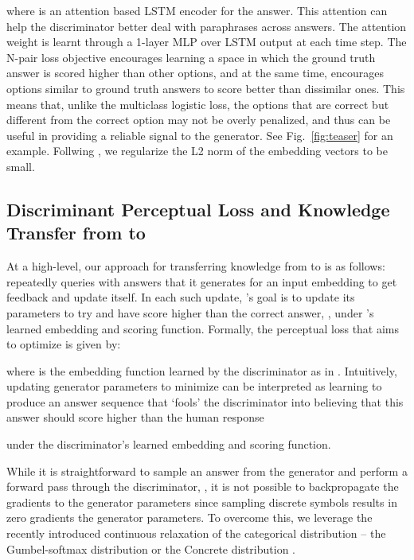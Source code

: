 \documentclass{article}
\begin{document}
where  is an attention based LSTM encoder for the answer. This attention can help the discriminator better deal with paraphrases across answers. The attention weight is learnt through a 1-layer MLP over LSTM output at each time step.
The N-pair loss objective encourages learning a space in which the ground truth answer is scored higher than other options, and at the same time, encourages options similar to ground truth answers to score better than dissimilar ones.  
This  means that, unlike the multiclass logistic loss, the options that are correct but 
different from the correct option may not be overly penalized, and thus can be useful in providing a reliable signal to the generator.  See Fig.~\ref{fig:teaser} for an example. 
Follwing \cite{sohn2016improved}, we regularize the L2 norm of the embedding vectors to be small.


\subsection{Discriminant Perceptual Loss and Knowledge Transfer from  to } 
\label{sec:transfer}


At a high-level, our approach for transferring knowledge from  to  is as follows: 
 repeatedly queries  with answers  that it generates for an input embedding   
to get feedback and update itself. 
In each such update, 's goal is to update its parameters to try and have  score higher than the correct answer, , under 's learned embedding and scoring function. 
Formally, the perceptual loss that  aims to optimize is given by:

where  is the embedding function learned by the discriminator as in . 
Intuitively, updating generator parameters to minimize  can be interpreted as 
learning to produce an answer sequence  that `fools' the discriminator into believing 
that this answer should score higher than the human response

under the discriminator's learned 
embedding  and scoring function. 

While it is straightforward to sample an answer   from the generator and perform a forward pass 
through the discriminator, \naively, it is not possible to backpropagate the gradients to the generator parameters 
since sampling discrete symbols results in zero gradients \wrt the generator parameters. 
To overcome this, we leverage the recently introduced 
continuous relaxation of the categorical distribution -- the Gumbel-softmax distribution or the Concrete distribution 
\cite{jang2016categorical, maddison2016concrete}. 
\end{document}
